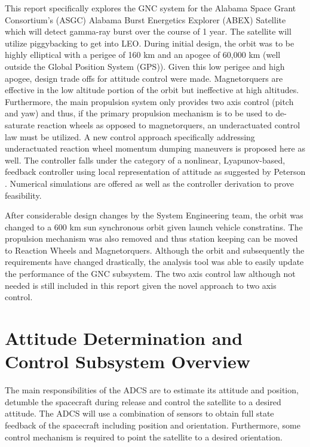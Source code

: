 \documentclass[conf]{new-aiaa}
\begin{document}
This report specifically explores the GNC system for the Alabama Space Grant Consortium’s (ASGC) Alabama Burst Energetics Explorer (ABEX) Satellite which will detect gamma-ray burst over the course of 1 year. The satellite will utilize piggybacking to get into LEO. During initial design, the orbit was to be highly elliptical with a perigee of 160 km and an apogee of 60,000 km (well outside the Global Position System (GPS)). Given this low perigee and high apogee, design trade offs for attitude control were made. Magnetorquers are effective in the low altitude portion of the orbit but ineffective at high altitudes. Furthermore, the main propulsion system only provides two axis control (pitch and yaw) and thus, if the primary propulsion mechanism is to be used to de-saturate reaction wheels as opposed to magnetorquers, an underactuated control law must be utilized. A new control approach specifically addressing underactuated reaction wheel momentum dumping maneuvers is proposed here as well. The controller falls under the category of a nonlinear, Lyapunov-based, feedback controller using local representation of attitude as suggested by Peterson \cite{7}. Numerical simulations are offered as well as the controller derivation to prove feasibility. 

After considerable design changes by the System Engineering team, the orbit was changed to a 600 km sun synchronous orbit given launch vehicle constratins. The propulsion mechanism was also removed and thus station keeping can be moved to Reaction Wheels and Magnetorquers. Although the orbit and subsequently the requirements have changed drastically, the analysis tool was able to easily update the performance of the GNC subsystem. The two axis control law although not needed is still included in this report given the novel approach to two axis control.


\section{Attitude Determination and Control Subsystem Overview}

The main responsibilities of the ADCS are to estimate its attitude and position, detumble the spacecraft during release and control the satellite to a desired attitude. The ADCS will use a combination of sensors to obtain full state feedback of the spacecraft including position and orientation. Furthermore, some control mechanism is required to point the satellite to a desired orientation.
\end{document}
